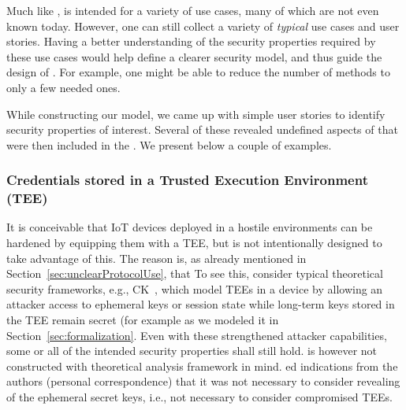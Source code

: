 \documentclass[runningheads, envcountsame, a4paper, draft, x11names]{llncs}
\newcommand{\spacehack}{\vspace{-1em}}
\begin{document}
Much like \mDandTls{}, \mEdhoc{} is intended for a variety of use cases,
many of which are not even known today. However, one can still collect a
variety of \emph{typical} use cases and user stories.
%
Having a better understanding of the security properties required by these use
cases would help define a clearer security model, and thus guide the design of
\mEdhoc{}.
%
For example, one might be able to reduce the number of methods to only
a few needed ones.
%

While constructing our model, we came up with simple user stories to identify
security properties of interest.
%
Several of these revealed undefined aspects of \mEdhoc{} that were then
included in the \mSpec.
%
We present below a couple of examples.
%

\spacehack
\subsubsection{Credentials stored in a Trusted Execution Environment (TEE)}
It is conceivable that IoT devices deployed in a hostile environments can be
hardened by equipping them with a TEE, but \mEdhoc{} is not intentionally
designed to take advantage of this.
%
The reason is, as already mentioned in Section~\ref{sec:unclearProtocolUse},
that \mEdhoc{}
To see this, consider typical theoretical security frameworks, e.g.,
CK~\cite{DBLP:conf/crypto/CanettiK02}, which model TEEs in a device by allowing
an attacker access to ephemeral keys or session state while long-term keys
stored in the TEE remain secret (for example as we modeled it in
Section~\ref{sec:formalization}.
%
Even with these strengthened attacker capabilities, some or all of the intended
security properties shall still hold.
%
\mEdhoc{} is however not constructed with theoretical analysis framework in
mind.
ed indications from the \mSpec{} authors (personal correspondence) that it was
not necessary to consider revealing of the ephemeral secret keys, i.e., not
necessary to consider compromised TEEs. 
%
\end{document}

